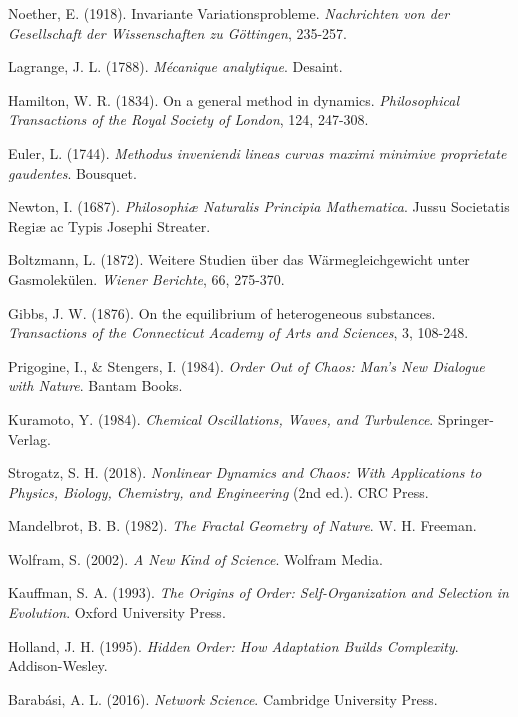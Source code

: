 \documentclass[12pt,a4paper]{article}
\begin{document}
\begin{thebibliography}{99}
Noether, E. (1918). Invariante Variationsprobleme. \textit{Nachrichten von der Gesellschaft der Wissenschaften zu Göttingen}, 235-257.

Lagrange, J. L. (1788). \textit{Mécanique analytique}. Desaint.

Hamilton, W. R. (1834). On a general method in dynamics. \textit{Philosophical Transactions of the Royal Society of London}, 124, 247-308.

Euler, L. (1744). \textit{Methodus inveniendi lineas curvas maximi minimive proprietate gaudentes}. Bousquet.

Newton, I. (1687). \textit{Philosophiæ Naturalis Principia Mathematica}. Jussu Societatis Regiæ ac Typis Josephi Streater.

Boltzmann, L. (1872). Weitere Studien über das Wärmegleichgewicht unter Gasmolekülen. \textit{Wiener Berichte}, 66, 275-370.

Gibbs, J. W. (1876). On the equilibrium of heterogeneous substances. \textit{Transactions of the Connecticut Academy of Arts and Sciences}, 3, 108-248.

Prigogine, I., \& Stengers, I. (1984). \textit{Order Out of Chaos: Man's New Dialogue with Nature}. Bantam Books.

Kuramoto, Y. (1984). \textit{Chemical Oscillations, Waves, and Turbulence}. Springer-Verlag.

Strogatz, S. H. (2018). \textit{Nonlinear Dynamics and Chaos: With Applications to Physics, Biology, Chemistry, and Engineering} (2nd ed.). CRC Press.

Mandelbrot, B. B. (1982). \textit{The Fractal Geometry of Nature}. W. H. Freeman.

Wolfram, S. (2002). \textit{A New Kind of Science}. Wolfram Media.

Kauffman, S. A. (1993). \textit{The Origins of Order: Self-Organization and Selection in Evolution}. Oxford University Press.

Holland, J. H. (1995). \textit{Hidden Order: How Adaptation Builds Complexity}. Addison-Wesley.

Barabási, A. L. (2016). \textit{Network Science}. Cambridge University Press.


\end{thebibliography}
\end{document}

